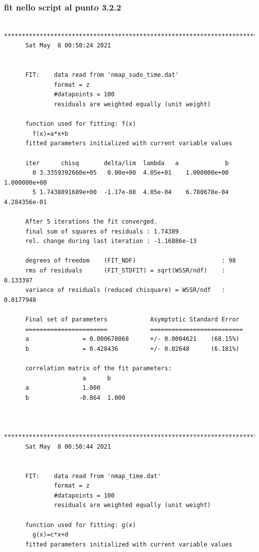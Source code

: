 \documentclass{article}
\begin{document}
\subsubsection{fit nello script al punto 3.2.2}
\begin{verbatim}
      *******************************************************************************
      Sat May  8 00:50:24 2021
      
      
      FIT:    data read from 'nmap_sudo_time.dat'
              format = z
              #datapoints = 100
              residuals are weighted equally (unit weight)
      
      function used for fitting: f(x)
        f(x)=a*x+b
      fitted parameters initialized with current variable values
      
      iter      chisq       delta/lim  lambda   a             b            
        0 3.3359392660e+05   0.00e+00  4.05e+01    1.000000e+00   1.000000e+00
        5 1.7438891689e+00  -1.17e-08  4.05e-04    6.780678e-04   4.284356e-01
      
      After 5 iterations the fit converged.
      final sum of squares of residuals : 1.74389
      rel. change during last iteration : -1.16886e-13
      
      degrees of freedom    (FIT_NDF)                        : 98
      rms of residuals      (FIT_STDFIT) = sqrt(WSSR/ndf)    : 0.133397
      variance of residuals (reduced chisquare) = WSSR/ndf   : 0.0177948
      
      Final set of parameters            Asymptotic Standard Error
      =======================            ==========================
      a               = 0.000678068      +/- 0.0004621    (68.15%)
      b               = 0.428436         +/- 0.02648      (6.181%)
      
      correlation matrix of the fit parameters:
                      a      b      
      a               1.000 
      b              -0.864  1.000 
      
      
      *******************************************************************************
      Sat May  8 00:50:44 2021
      
      
      FIT:    data read from 'nmap_time.dat'
              format = z
              #datapoints = 100
              residuals are weighted equally (unit weight)
      
      function used for fitting: g(x)
        g(x)=c*x+d
      fitted parameters initialized with current variable values
      

\end{verbatim}
\end{document}
